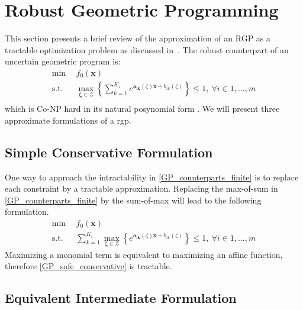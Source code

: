 \section{Robust Geometric Programming} \label{RGP}

This section presents a brief review of the approximation of an RGP as a
tractable optimization problem as discussed in~\cite{Saab2018}.
The robust counterpart of an uncertain geometric program is:
\begin{equation}
    \begin{split}
        \min &~~f_0\left(\mathbf{x}\right)\\
        \text{s.t.} &~~\max_{\mathbf{\zeta} \in \mathcal{Z}} \left\{\textstyle{\sum}_{k=1}^{K_i}e^{\mathbf{a_{ik}}\left(\zeta\right)\mathbf{x} + b_{ik}\left(\zeta\right)}\right\} \leq 1, ~\forall i \in 1,...,m\\
    \end{split}
    \label{GP_counterparts_finite}
\end{equation}
which is Co-NP hard in its natural posynomial form \cite{RGPcoNP}. We will present three approximate formulations of a \gls{rgp}.

\subsection{Simple Conservative Formulation}
One way to approach the intractability in \eqref{GP_counterparts_finite} is to replace each constraint by a tractable approximation.
Replacing the max-of-sum in \eqref{GP_counterparts_finite} by the sum-of-max will lead to the following formulation.
\begin{equation}
    \begin{split}
        \min &~~f_0\left(\mathbf{x}\right)\\
        \text{s.t.} &~~\textstyle{\sum}_{k=1}^{K_i} {\displaystyle \max_{\mathbf{\zeta} \in \mathcal{Z}}} \left\{e^{\mathbf{a_{ik}}\left(\zeta\right)\mathbf{x} + b_{ik}\left(\zeta\right)}\right\} \leq 1, ~\forall i \in 1,...,m
    \end{split}
    \label{GP_safe_conservative}
\end{equation}
Maximizing a monomial term is equivalent to maximizing an affine function, therefore \eqref{GP_safe_conservative} is tractable.

\subsection{Equivalent Intermediate Formulation}

